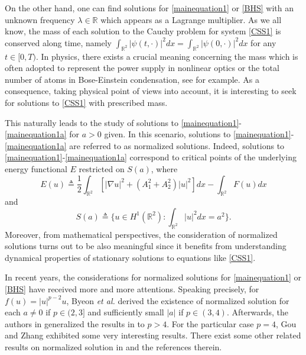 \documentclass[11pt]{amsart}
\numberwithin{equation}{section}
\theoremstyle{definition}
\newcommand{\R}{\mathbb{R}}
\begin{document}
On the other hand, one can find solutions for \eqref{mainequation1} or \eqref{BHS}
with an unknown frequency $\lambda\in\R$ which appears as a Lagrange multiplier.
As we all know, the mass of each solution to the Cauchy problem for system \eqref{CSS1} is conserved along time, namely
$\int_{\R^2}|\psi(t,\cdot)|^2dx= \int_{\R^2}|\psi(0,\cdot)|^2dx$
for any $t\in[0,T)$. In physics, there exists a crucial meaning concerning the mass
which is often adopted to represent the power supply in nonlinear
optics or the total number of atoms in Bose-Einstein condensation, see \cite{Esry,Frantzeskakis,Malomed} for example.
As a consequence, taking physical point of views into account,
it is interesting to seek for solutions to \eqref{CSS1} with prescribed mass.

This
naturally leads to the study of solutions to \eqref{mainequation1}-\eqref{mainequation1a} for $a>0$ given. In this scenario, solutions to
\eqref{mainequation1}-\eqref{mainequation1a}
are referred to as normalized solutions. Indeed, solutions to \eqref{mainequation1}-\eqref{mainequation1a} correspond to critical points of the underlying energy
functional $E$ restricted on $S(a)$, where
\begin{equation}\label{functional}
	E(u)\triangleq\frac12\int_{\R^2}[|\nabla u|^2 + (A_1^2+A_2^2)|u|^2]dx-\int_{\R^2}F(u)dx
\end{equation}
and
\[
S(a)\triangleq\bigg\{u\in H^1(\R^2):\int_{\R^2}|u|^2dx=a^2\bigg\}.
\]
Moreover, from mathematical perspectives, the consideration of normalized solutions turns out to be also
meaningful since it benefits from understanding dynamical properties of stationary solutions to
equations like \eqref{CSS1}.

In recent years, the considerations for normalized solutions for
\eqref{mainequation1} or \eqref{BHS} have received more and more attentions.
Speaking precisely, for $f(u)=|u|^{p-2}u$,
Byeon \emph{et al.} \cite{Byeon} derived the existence of normalized solution
for each $a\neq0$ if $p\in(2,3]$ and sufficiently small $|a|$ if $p\in(3,4)$. Afterwards,
the authors in \cite{Yuan,LX} generalized the results in \cite{Byeon} to $p>4$.
For the particular case $p=4$, Gou and Zhang \cite{GZ} exhibited some very interesting results.
There exist some other related results on normalized solution in
\cite{LC,Luo,YCS1,YCS2,YTC} and the references therein.
\end{document}

